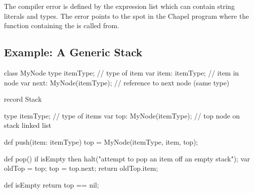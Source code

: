 The compiler error is defined by the expression list which can contain
string literals and types.  The error points to the spot in the Chapel
program where the function containing
the  is called from.

\subsection{Example: A Generic Stack}
\label{Example_Generic_Stack}

\begin{chapel}
class MyNode {
  type itemType;              // type of item
  var item: itemType;         // item in node
  var next: MyNode(itemType); // reference to next node (same type)
}

record Stack {
  type itemType;             // type of items
  var top: MyNode(itemType); // top node on stack linked list

  def push(item: itemType) {
    top = MyNode(itemType, item, top);
  }

  def pop() {
    if isEmpty then
      halt("attempt to pop an item off an empty stack");
    var oldTop = top;
    top = top.next;
    return oldTop.item;
  }

  def isEmpty return top == nil;
}
\end{chapel}
